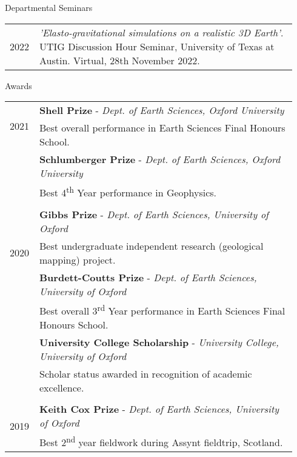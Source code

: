 \documentclass{resume}
\begin{document}
\begin{rSection}{Departmental Seminars}

\begin{tabular}{p{0.07\linewidth} | p{0.87\linewidth}}
\multirow{1}{*}{2022} & \textit{'Elasto-gravitational simulations on a realistic 3D Earth'}. UTIG Discussion Hour Seminar, University of Texas at Austin. Virtual, 28th November 2022. \\  
\end{tabular}



\begin{rSection}{Awards}

\begin{tabular}{p{0.07\linewidth} | p{0.87\linewidth}}
\multirow{2}{*}{2021}& \textbf{Shell Prize} - \textit{Dept. of Earth Sciences, Oxford University} \\  & \hspace{0.7cm} Best overall performance in Earth Sciences Final Honours School.  \\
&  \textbf{Schlumberger Prize} - \textit{Dept. of Earth Sciences, Oxford University} \\ &\hspace{0.7cm} Best 4\textsuperscript{th} Year performance in Geophysics. \\ 
\\
\multirow{3}{*}{2020}& \textbf{Gibbs Prize} - \textit{Dept. of Earth Sciences, University of Oxford} \\ & \hspace{0.7cm} Best undergraduate independent research (geological mapping) project. \\
& \textbf{Burdett-Coutts Prize} - \textit{Dept. of Earth Sciences, University of Oxford} \\ & \hspace{0.7cm} Best overall 3\textsuperscript{rd} Year performance in Earth Sciences Final Honours School. \\ 
& \textbf{University College Scholarship} - \textit{University College, University of Oxford} \\ & \hspace{0.7cm} Scholar status awarded in recognition of academic excellence. \\ 
\\
\multirow{2}{*}{2019}& \textbf{Keith Cox Prize} - \textit{Dept. of Earth Sciences, University of Oxford} \\ & \hspace{0.7cm}Best 2\textsuperscript{nd} year fieldwork during Assynt fieldtrip, Scotland. \\

\end{tabular}
\end{rSection}
\end{rSection}
\end{document}
